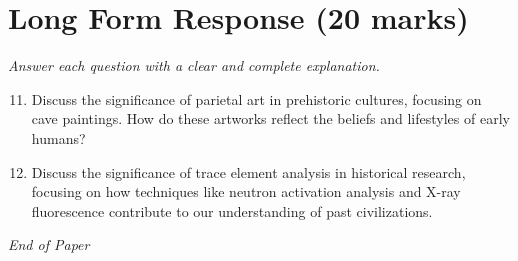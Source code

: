 \documentclass[12pt]{article}
\begin{document}
\section*{Long Form Response (20 marks)}
\textit{Answer each question with a clear and complete explanation.}
\begin{enumerate}[label=\arabic*.]
\setcounter{enumi}{10}
\item Discuss the significance of parietal art in prehistoric cultures, focusing on cave paintings. How do these artworks reflect the beliefs and lifestyles of early humans?
\item Discuss the significance of trace element analysis in historical research, focusing on how techniques like neutron activation analysis and X-ray fluorescence contribute to our understanding of past civilizations.
\end{enumerate}

\vfill
\noindent\textit{End of Paper}
\end{document}
